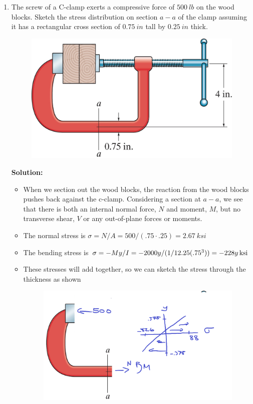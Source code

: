 \documentclass[12pt, oneside]{article}
\let\US\SI
\begin{document}
\begin{enumerate}
	\item %
		The screw of a C-clamp exerts a compressive force of $ 	\US{500}{lb}  $ on the wood blocks.
		Sketch the stress distribution on section $a-a$ of the clamp assuming it has a rectangular cross section of $ 	\US{0.75}{in}  $ tall by $ 	\US{0.25 }{in }  $ thick.
		\begin{figure}[H]
			\centering
			\includegraphics[width=0.6\linewidth]{8-27}
		\end{figure}
			\textbf{Solution:}
			\begin{itemize}
				\item When we section out the wood blocks, the reaction from the wood blocks pushes back against the c-clamp.
					Considering a section at $a-a$, we see that there is both an internal normal force, $N$ and moment, $M$, but no transverse shear, $V$ or any out-of-plane forces or moments.
			\item The normal stress is $\sigma = N/A = 500/(.75 \cdot .25) = 	\US{2.67}{ksi} $
			\item The bending stress is $\sigma = -My/I = -2000 y / (1/12 .25 (.75^3)) = 	\US[number-math-rm = \mathnormal, parse-numbers = false]{-228 y }{ksi} $
			\item These stresses will add together, so we can sketch the stress through the thickness as shown
				\begin{figure}[H]
					\centering
					\includegraphics[width=0.6\linewidth]{8-27-ans}
				\end{figure}

			\end{itemize}


\end{enumerate}
\end{document}
